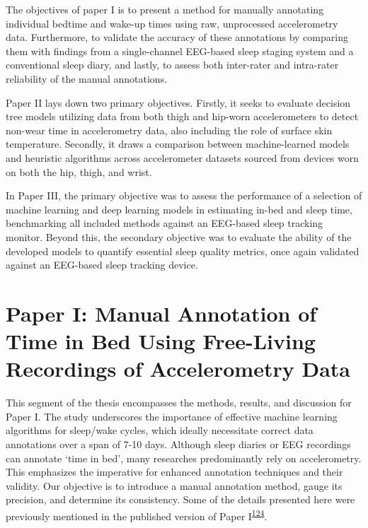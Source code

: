 \documentclass[
  10pt,
]{scrbook}
\begin{document}
The objectives of paper I is to present a method for manually annotating
individual bedtime and wake-up times using raw, unprocessed
accelerometry data. Furthermore, to validate the accuracy of these
annotations by comparing them with findings from a single-channel
EEG-based sleep staging system and a conventional sleep diary, and
lastly, to assess both inter-rater and intra-rater reliability of the
manual annotations.

Paper II lays down two primary objectives. Firstly, it seeks to evaluate
decision tree models utilizing data from both thigh and hip-worn
accelerometers to detect non-wear time in accelerometry data, also
including the role of surface skin temperature. Secondly, it draws a
comparison between machine-learned models and heuristic algorithms
across accelerometer datasets sourced from devices worn on both the hip,
thigh, and wrist.

In Paper III, the primary objective was to assess the performance of a
selection of machine learning and deep learning models in estimating
in-bed and sleep time, benchmarking all included methods against an
EEG-based sleep tracking monitor. Beyond this, the secondary objective
was to evaluate the ability of the developed models to quantify
essential sleep quality metrics, once again validated against an
EEG-based sleep tracking device.

\hypertarget{paper-i-manual-annotation-of-time-in-bed-using-free-living-recordings-of-accelerometry-data}{%
\chapter{Paper I: Manual Annotation of Time in Bed Using Free-Living
Recordings of Accelerometry
Data}\label{paper-i-manual-annotation-of-time-in-bed-using-free-living-recordings-of-accelerometry-data}}

This segment of the thesis encompasses the methods, results, and
discussion for Paper I. The study underscores the importance of
effective machine learning algorithms for sleep/wake cycles, which
ideally necessitate correct data annotations over a span of 7-10 days.
Although sleep diaries or EEG recordings can annotate `time in bed',
many researches predominantly rely on accelerometry. This emphasizes the
imperative for enhanced annotation techniques and their validity. Our
objective is to introduce a manual annotation method, gauge its
precision, and determine its consistency. Some of the details presented
here were previously mentioned in the published version of Paper
I\textsuperscript{\protect\hyperlink{ref-skovgaard_manual_2021}{124}}.
\end{document}
